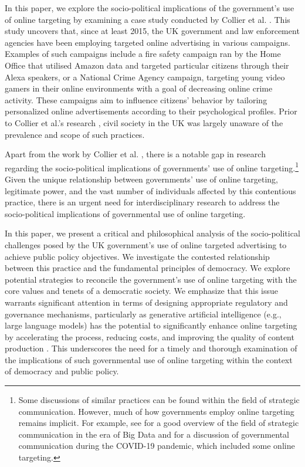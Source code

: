 \documentclass[preprint]{acmart}
\begin{document}
In this paper, we explore the socio-political implications of the government's use of online targeting by examining a case study conducted by Collier et al. \cite{Collier2022}. This study uncovers that, since at least 2015, the UK government and law enforcement agencies have been employing targeted online advertising in various campaigns. Examples of such campaigns include a fire safety campaign ran by the Home Office that utilised Amazon data and targeted particular citizens through their Alexa speakers, or a National Crime Agency campaign, targeting young video gamers in their online environments with a goal of decreasing online crime activity. These campaigns aim to influence citizens' behavior by tailoring personalized online advertisements according to their psychological profiles. Prior to Collier et al.'s research \cite{Collier2022}, civil society in the UK was largely unaware of the prevalence and scope of such practices.


Apart from the work by Collier et al. \cite{Collier2022}, there is a notable gap in research regarding the socio-political implications of governments' use of online targeting.\footnote{Some discussions of similar practices can be found within the field of strategic communication. However, much of how governments employ online targeting remains implicit. For example, see \cite{michelsen2019} for a good overview of the field of strategic communication in the era of Big Data and \cite{hyland2021} for a discussion of governmental communication during the COVID-19 pandemic, which included some online targeting.} Given the unique relationship between governments' use of online targeting, legitimate power, and the vast number of individuals affected by this contentious practice, there is an urgent need for interdisciplinary research to address the socio-political implications of governmental use of online targeting. 


In this paper, we present a critical and philosophical analysis of the socio-political challenges posed by the UK government's use of online targeted advertising to achieve public policy objectives. We investigate the contested relationship between this practice and the fundamental principles of democracy. We explore potential strategies to reconcile the government's use of online targeting with the core values and tenets of a democratic society. We emphasize that this issue warrants significant attention in terms of designing appropriate regulatory and governance mechanisms, particularly as generative artificial intelligence (e.g., large language models) has the potential to significantly enhance online targeting by accelerating the process, reducing costs, and improving the quality of content production \cite{weidinger2022taxonomy}. This underscores the need for a timely and thorough examination of the implications of such governmental use of online targeting within the context of democracy and public policy.
\end{document}
